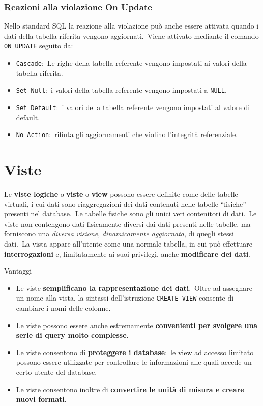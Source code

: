 \subsubsection{Reazioni alla violazione On Update}

Nello standard SQL la reazione alla violazione può anche essere attivata quando i dati della tabella riferita vengono aggiornati.\
Viene attivato mediante il comando \texttt{ON UPDATE} seguito da:
\begin{itemize}
	\item \texttt{Cascade}:\ Le righe della tabella referente vengono impostati ai valori della tabella riferita.
	\item \texttt{Set Null}:\ i valori della tabella referente vengono  impostati a \texttt{NULL}.
	\item \texttt{Set Default}:\ i valori della tabella referente vengono impostati al valore di default.
	\item \texttt{No Action}:\ rifiuta gli aggiornamenti che violino l'integrità referenziale.
\end{itemize}

\section{Viste}

Le \textbf{viste logiche} o \textbf{viste} o \textbf{view} possono essere definite come delle tabelle virtuali, i cui dati sono riaggregazioni dei dati contenuti nelle tabelle ``fisiche'' presenti nel database.\
Le tabelle fisiche sono gli unici veri contenitori di dati.\
Le viste non contengono dati fisicamente diversi dai dati presenti nelle tabelle, ma forniscono una \textit{diversa visione}, \textit{dinamicamente aggiornata}, di quegli stessi dati.\
La vista appare all'utente come una normale tabella, in cui può effettuare \textbf{interrogazioni} e, limitatamente ai suoi privilegi, anche \textbf{modificare dei dati}.

\noindent Vantaggi
\begin{itemize}
	\item Le viste \textbf{semplificano la rappresentazione dei dati}.\ Oltre ad assegnare un nome alla vista, la sintassi dell'istruzione \texttt{CREATE VIEW} consente di cambiare i nomi delle colonne.\
	\item Le viste possono essere anche estremamente \textbf{convenienti per svolgere una serie di query molto complesse}.
	\item Le viste consentono di \textbf{proteggere i database}:\ le view ad accesso limitato possono essere utilizzate per controllare le informazioni alle quali accede un certo utente del database.
	\item Le viste consentono inoltre di \textbf{convertire le unità di misura e creare nuovi formati}.
\end{itemize}

